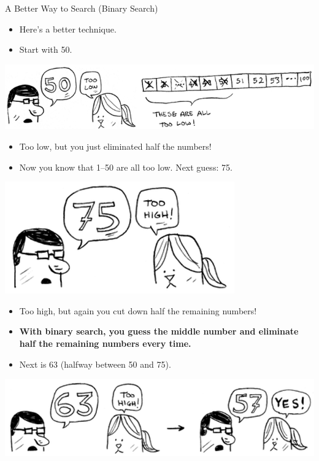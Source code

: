 \documentclass[ignorenonframetext,]{beamer}
\providecommand{\tightlist}{%
  \setlength{\itemsep}{0pt}\setlength{\parskip}{0pt}}
\begin{document}
\begin{frame}{A Better Way to Search (Binary Search)}
\protect\hypertarget{a-better-way-to-search-binary-search}{}

\begin{itemize}
\tightlist
\item
  Here's a better technique.
\item
  Start with 50.
\end{itemize}

\includegraphics{./Chapter01-figure/binary_search_01.png}

\begin{itemize}
\tightlist
\item
  Too low, but you just eliminated half the numbers!
\item
  Now you know that 1--50 are all too low. Next guess: 75.
\end{itemize}

\includegraphics{./Chapter01-figure/binary_search_02.png}

\begin{itemize}
\tightlist
\item
  Too high, but again you cut down half the remaining numbers!
\item
  \textbf{With binary search, you guess the middle number and eliminate
  half the remaining numbers every time.}
\item
  Next is 63 (halfway between 50 and 75).
\end{itemize}

\includegraphics{./Chapter01-figure/binary_search_03.png}

\end{frame}
\end{document}

